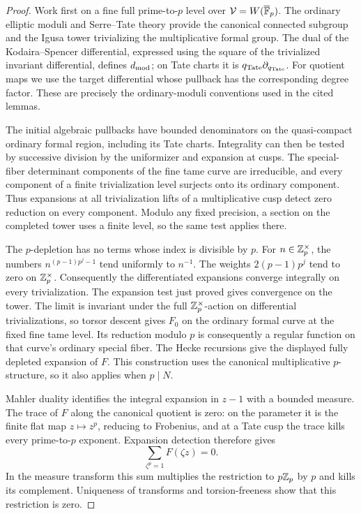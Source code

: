 \begin{proof}
Work first on a fine full prime-to-\(p\) level over
\(\mathcal V=W(\overline{\mathbb F}_p)\).  The ordinary elliptic moduli and
Serre--Tate theory \cite{DeligneRapoport,KatzMazur} provide the
canonical connected subgroup and the
Igusa tower trivializing the multiplicative formal group.  The dual of
the Kodaira--Spencer differential, expressed using the square of the
trivialized invariant differential, defines \(d_{\rm mod}\); on Tate
charts it is \(q_{\rm Tate}\partial_{q_{\rm Tate}}\).
For quotient maps we use the target differential whose pullback has
the corresponding degree factor.  These are precisely the
ordinary-moduli conventions used in the cited lemmas.

The initial algebraic pullbacks have bounded denominators on the
quasi-compact ordinary formal region, including its Tate charts.
Integrality can then be tested by successive division by the
uniformizer and expansion at cusps.  The special-fiber determinant
components of the fine tame curve are irreducible, and every
component of a finite trivialization level surjects onto its ordinary
component.  Thus expansions at all trivialization lifts of a
multiplicative cusp detect zero reduction on every component.
Modulo any fixed precision, a section on the completed tower uses a
finite level, so the same test applies there.

The \(p\)-depletion has no terms whose index is divisible by \(p\).
For \(n\in\mathbb Z_p^\times\), the numbers
\(n^{(p-1)p^j-1}\) tend uniformly to \(n^{-1}\).
The weights \(2(p-1)p^j\) tend to zero on
\(\mathbb Z_p^\times\).  Consequently the differentiated expansions converge
integrally on every trivialization.  The expansion test just proved
gives convergence on the tower.  The limit is invariant under the
full \(\mathbb Z_p^\times\)-action on differential trivializations, so
torsor descent gives \(F_0\) on the ordinary formal curve at the
fixed fine tame level.  Its reduction modulo \(p\) is consequently
a regular function on that curve's ordinary special fiber.
The Hecke recursions give the displayed
fully depleted expansion of \(F\).  This construction uses the
canonical multiplicative \(p\)-structure, so it also applies when
\(p\mid N\).

Mahler duality identifies the integral expansion in \(z-1\) with a
bounded measure.  The trace of \(F\) along the canonical quotient is
zero: on the parameter it is the finite flat map \(z\mapsto z^p\),
reducing to Frobenius, and at a Tate cusp the trace kills every
prime-to-\(p\) exponent.  Expansion detection therefore gives
\[
 \sum_{\zeta^p=1}F(\zeta z)=0.
\]
In the measure transform this sum multiplies the restriction to
\(p\mathbb Z_p\) by \(p\) and kills its complement.  Uniqueness of transforms
and torsion-freeness show that this restriction is zero.


\end{proof}
